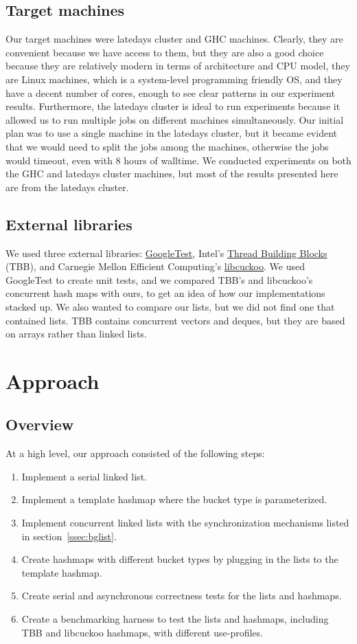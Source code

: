 \documentclass[11pt]{article}
\begin{document}
\subsection{Target machines}
Our target machines were latedays cluster and GHC machines. Clearly, they are
convenient because we have access to them, but they are also a good choice
because they are relatively modern in terms of architecture and CPU model, they
are Linux machines, which is a system-level programming friendly OS, and they
have a decent number of cores, enough to see clear patterns in our experiment
results. Furthermore, the latedays cluster is ideal to run experiments because
it allowed us to run multiple jobs on different machines simultaneously. Our
initial plan was to use a single machine in the latedays cluster, but it became
evident that we would need to split the jobs among the machines, otherwise the
jobs would timeout, even with 8 hours of walltime. We conducted experiments on
both the GHC and latedays cluster machines, but most of the results presented
here are from the latedays cluster.

\subsection{External libraries}
We used three external libraries: \href{https://github.com/google/googletest}
{GoogleTest}, Intel's \href{https://github.com/01org/tbb}{Thread Building
Blocks} (TBB), and Carnegie Mellon Efficient Computing's
\href{https://github.com/efficient/libcuckoo}{libcuckoo}. We used GoogleTest to
create unit tests, and we compared TBB's and libcuckoo's concurrent hash maps
with ours, to get an idea of how our implementations stacked up. We also wanted
to compare our lists, but we did not find one that contained lists. TBB contains
concurrent vectors and deques, but they are based on arrays rather than linked
lists.

\section{Approach}

\subsection{Overview}
At a high level, our approach consisted of the following steps:
\begin{enumerate}
\item
Implement a serial linked list.
\item
Implement a template hashmap where the bucket type is parameterized.
\item
Implement concurrent linked lists with the synchronization mechanisms listed in
section~\ref{ssec:bglist}.
\item
Create hashmaps with different bucket types by plugging in the lists to the
template hashmap.
\item
Create serial and asynchronous correctness tests for the lists and hashmaps.
\item
Create a benchmarking harness to test the lists and hashmaps, including TBB and
libcuckoo hashmaps, with different use-profiles.
\end{enumerate}
\end{document}
